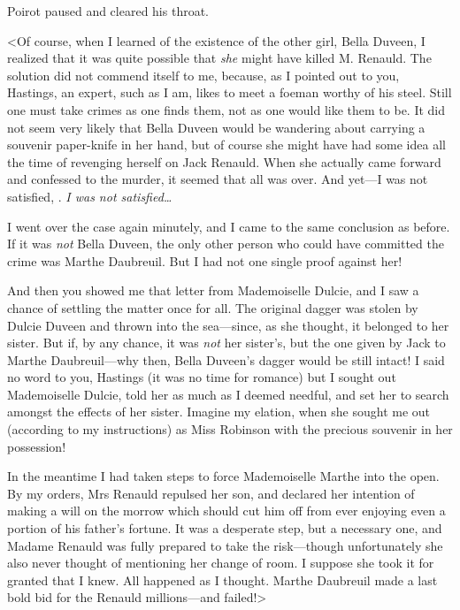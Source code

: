 

 Poirot paused and cleared his throat. 

<Of course, when I learned of the existence of the other girl, Bella Duveen, I realized that it was quite possible that \emph{she} might have killed M. Renauld. The solution did not commend itself to me, because, as I pointed out to you, Hastings, an expert, such as I am, likes to meet a foeman worthy of his steel. Still one must take crimes as one finds them, not as one would like them to be. It did not seem very likely that Bella Duveen would be wandering about carrying a souvenir paper-knife in her hand, but of course she might have had some idea all the time of revenging herself on Jack Renauld. When she actually came forward and confessed to the murder, it seemed that all was over. And yet—I was not satisfied, . \emph{I was not satisfied\dots} 

I went over the case again minutely, and I came to the same conclusion as before. If it was \emph{not} Bella Duveen, the only other person who could have committed the crime was Marthe Daubreuil. But I had not one single proof against her! 

And then you showed me that letter from Mademoiselle Dulcie, and I saw a chance of settling the matter once for all. The original dagger was stolen by Dulcie Duveen and thrown into the sea—since, as she thought, it belonged to her sister. But if, by any chance, it was \emph{not} her sister's, but the one given by Jack to Marthe Daubreuil—why then, Bella Duveen's dagger would be still intact! I said no word to you, Hastings (it was no time for romance) but I sought out Mademoiselle Dulcie, told her as much as I deemed needful, and set her to search amongst the effects of her sister. Imagine my elation, when she sought me out (according to my instructions) as Miss Robinson with the precious souvenir in her possession! 

In the meantime I had taken steps to force Mademoiselle Marthe into the open. By my orders, Mrs Renauld repulsed her son, and declared her intention of making a will on the morrow which should cut him off from ever enjoying even a portion of his father's fortune. It was a desperate step, but a necessary one, and Madame Renauld was fully prepared to take the risk—though unfortunately she also never thought of mentioning her change of room. I suppose she took it for granted that I knew. All happened as I thought. Marthe Daubreuil made a last bold bid for the Renauld millions—and failed!> 

